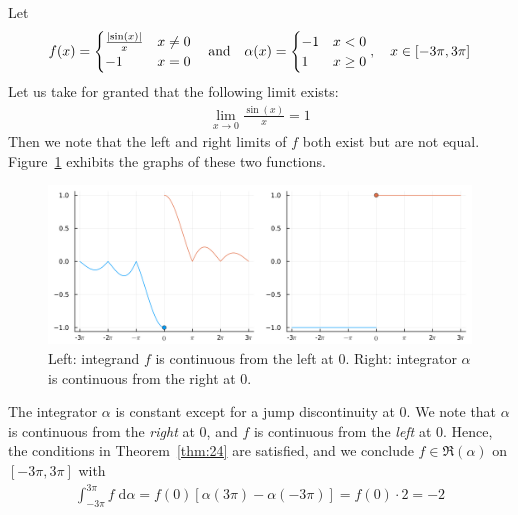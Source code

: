 \documentclass[thmcnt=section, 12pt]{my-elegantbook}
\begin{document}
\begin{example}
    Let 
    \begin{align*}
        f(x) = \begin{cases}
            \frac{\left\lvert \sin(x) \right\rvert}{x} &x \neq 0 \\
            -1 &x = 0
        \end{cases}
        \quad\text{and}\quad 
        \alpha(x) = \begin{cases}
            -1 &x < 0 \\
            1 &x \geq 0
        \end{cases},
        \quad x \in [-3\pi, 3\pi]
    \end{align*}
    Let us take for granted that the following limit exists:
    \begin{align*}
        \lim_{x \to 0} \frac{\sin (x)}{x} = 1
    \end{align*}
    Then we note that the left and right limits of $f$ both exist but are not equal. Figure~\ref{fig:10} exhibits the graphs of these two functions. 

    \begin{figure}[ht]
        \centering
        \includegraphics[scale=0.2]{figures/graph-009.png}
        \caption{Left: integrand $f$ is continuous from the left at $0$. Right: integrator $\alpha$ is continuous from the right at $0$.}
        \label{fig:10}
    \end{figure}
    
    The integrator $\alpha$ is constant except for a jump discontinuity at $0$. We note that $\alpha$ is continuous from the \textit{right} at $0$, and $f$ is continuous from the \textit{left} at $0$. Hence, the conditions in Theorem~\ref{thm:24} are satisfied, and we conclude $f \in \mathfrak{R}(\alpha)$ on $[-3\pi, 3\pi]$ with 
    \begin{align*}
        \int_{-3\pi}^{3\pi}f \; \mathrm{d}\alpha
        = f(0)[\alpha(3\pi) - \alpha(-3\pi)]
        = f(0) \cdot 2 = -2
    \end{align*} 
    \label{eg:3}
\end{example}
\end{document}
